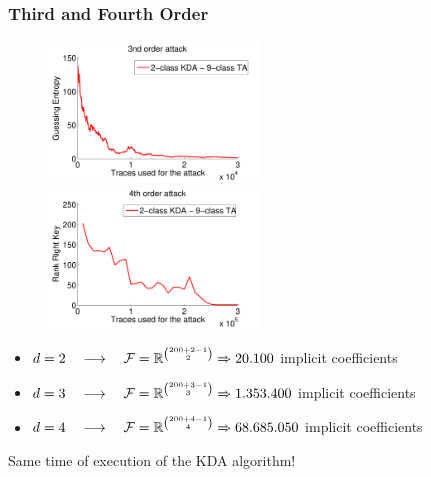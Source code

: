 \begin{frame}
\frametitle{Third and Fourth Order}
\begin{figure}
\includegraphics[width=0.5\textwidth]{figures/3order_only_9.pdf}
\includegraphics[width=0.5\textwidth]{figures/4order_only_9.pdf}
\end{figure}


\begin{itemize}
\item $d=2 \quad \longrightarrow \quad  \mathcal{F} = \mathbb{R}^{{200+2-1}\choose{2}} \Rightarrow 20.100$ implicit coefficients
\item $d=3 \quad \longrightarrow \quad  \mathcal{F} = \mathbb{R}^{{200+3-1}\choose{3}} \Rightarrow 1.353.400$ implicit coefficients
\item  $d=4 \quad \longrightarrow \quad  \mathcal{F} = \mathbb{R}^{{200+4-1}\choose{4}} \Rightarrow 68.685.050$ implicit coefficients
\end{itemize}

Same time of execution of the KDA algorithm!

\end{frame}

%
%


